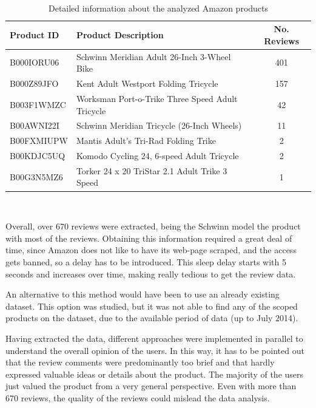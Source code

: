 \begin{table}[h!]
{}\selectfont
\label{productInfo}
\\[10pt]
\begin{tabular}{llc}
	\hline
	\textbf{Product ID} & \textbf{Product Description}  & \textbf{No. Reviews} \\
	\hline
	{B000IORU06} & Schwinn Meridian Adult 26-Inch 3-Wheel Bike           & 401\\
	{B000Z89JFO} & Kent Adult Westport Folding Tricycle                  & 157\\
	{B003F1WMZC} & Worksman Port-o-Trike Three Speed Adult Tricycle      & 42 \\
	{B00AWNI22I} & Schwinn Meridian Tricycle (26-Inch Wheels)      		 & 11 \\
	{B00FXMIUPW} & Mantis Adult's Tri-Rad Folding Trike					 & 2  \\
	{B00KDJC5UQ} & Komodo Cycling 24, 6-speed Adult Tricycle             & 2  \\
	{B00G3N5MZ6} & Torker 24 x 20 TriStar 2.1 Adult Trike 3 Speed        & 1  \\
	\hline
\end{tabular}
\\[15pt]
\caption{Detailed information about the analyzed Amazon products}
\end{table}


Overall, over 670 reviews were extracted, being the Schwinn model the product with most of the reviews. Obtaining this information required a great deal of time, since Amazon does not like to have its web-page scraped, and the access gets banned, so a delay has to be introduced. This sleep delay starts with 5 seconds and increases over time, making really tedious to get the review data.

An alternative to this method would have been to use an already existing dataset. This option was studied, but it was not able to find any of the scoped products on the dataset, due to the available period of data (up to July 2014).

Having extracted the data, different approaches were implemented in parallel to understand the overall opinion of the users. In this way, it has to be pointed out that the review comments were predominantly too brief and that hardly expressed valuable ideas or details about the product. The majority of the users just valued the product from a very general perspective. Even with more than 670 reviews, the quality of the reviews could mislead the data analysis.

